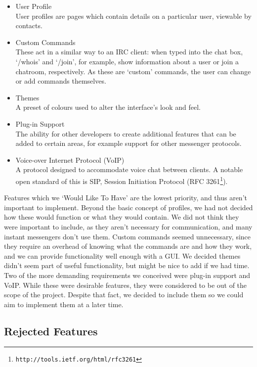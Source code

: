 \begin{itemize}
\item{User Profile\\
	User profiles are pages which contain details on a particular user, viewable by contacts.}
\item{Custom Commands\\
	These act in a similar way to an IRC client: when typed into the chat box, `/whois' and `/join', for example, show information about a user or join a chatroom, respectively. As these are `custom' commands, the user can change or add commands themselves.}
\item{Themes\\
	A preset of colours used to alter the interface's look and feel.}
\item{Plug-in Support\\
	The ability for other developers to create additional features that can be added to certain areas, for example support for other messenger protocols.}
\item{Voice-over Internet Protocol (VoIP)\\
	A protocol designed to accommodate voice chat between clients. A notable open standard of this is SIP, Session Initiation Protocol (RFC 3261\footnote{\texttt{http://tools.ietf.org/html/rfc3261}}).}
\end{itemize}

Features which we `Would Like To Have' are the lowest priority, and thus aren't important to implement. Beyond the basic concept of profiles, we had not decided how these would function or what they would contain. We did not think they were important to include, as they aren't necessary for communication, and many instant messengers don't use them. Custom commands seemed unnecessary, since they require an overhead of knowing what the commands are and how they work, and we can provide functionality well enough with a GUI. We decided themes didn't seem part of useful functionality, but might be nice to add if we had time. Two of the more demanding requirements we conceived were plug-in support and VoIP. While these were desirable features, they were considered to be out of the scope of the project. Despite that fact, we decided to include them so we could aim to implement them at a later time.

\subsection*{Rejected Features}

